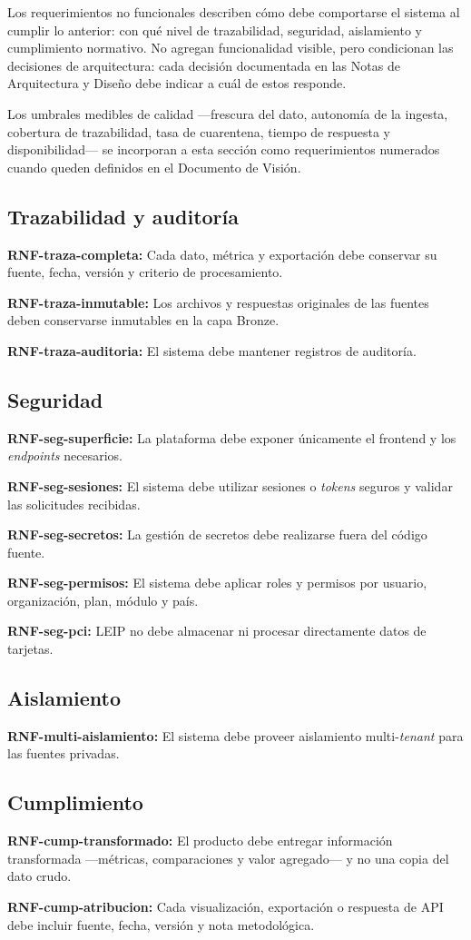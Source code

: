 \documentclass[11pt,a4paper]{article}
\newcommand{\proyectoNombre}{LEIP}
\newcommand{\rnf}[2]{%
  \noindent
  \textbf{RNF-#1:} #2
  \par\smallskip
}
\begin{document}
Los requerimientos no funcionales describen cómo debe comportarse el sistema al
cumplir lo anterior: con qué nivel de trazabilidad, seguridad, aislamiento y
cumplimiento normativo. No agregan funcionalidad visible, pero condicionan las
decisiones de arquitectura: cada decisión documentada en las Notas de
Arquitectura y Diseño debe indicar a cuál de estos responde.

Los umbrales medibles de calidad ---frescura del dato, autonomía de la ingesta,
cobertura de trazabilidad, tasa de cuarentena, tiempo de respuesta y
disponibilidad--- se incorporan a esta sección como requerimientos numerados
cuando queden definidos en el Documento de Visión.

\subsection{Trazabilidad y auditoría}

\rnf{traza-completa}{Cada dato, m\'etrica y exportaci\'on debe conservar su
fuente, fecha, versi\'on y criterio de procesamiento.}

\rnf{traza-inmutable}{Los archivos y respuestas originales de las fuentes deben
conservarse inmutables en la capa Bronze.}

\rnf{traza-auditoria}{El sistema debe mantener registros de auditor\'ia.}

\subsection{Seguridad}

\rnf{seg-superficie}{La plataforma debe exponer \'unicamente el frontend y los
\emph{endpoints} necesarios.}

\rnf{seg-sesiones}{El sistema debe utilizar sesiones o \emph{tokens} seguros y
validar las solicitudes recibidas.}

\rnf{seg-secretos}{La gesti\'on de secretos debe realizarse fuera del c\'odigo
fuente.}

\rnf{seg-permisos}{El sistema debe aplicar roles y permisos por usuario,
organizaci\'on, plan, m\'odulo y pa\'is.}

\rnf{seg-pci}{\proyectoNombre{} no debe almacenar ni procesar directamente datos
de tarjetas.}

\subsection{Aislamiento}

\rnf{multi-aislamiento}{El sistema debe proveer aislamiento
multi-\emph{tenant} para las fuentes privadas.}

\subsection{Cumplimiento}

\rnf{cump-transformado}{El producto debe entregar informaci\'on transformada
---m\'etricas, comparaciones y valor agregado--- y no una copia del dato crudo.}

\rnf{cump-atribucion}{Cada visualizaci\'on, exportaci\'on o respuesta de API
debe incluir fuente, fecha, versi\'on y nota metodol\'ogica.}
\end{document}
